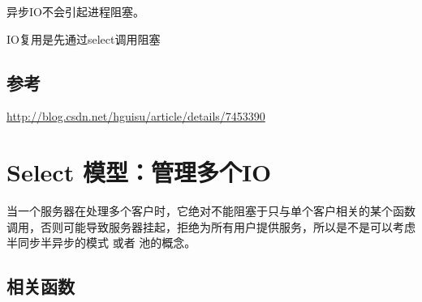 \documentclass[UTF8,a4paper,12pt]{ctexbook}
\begin{document}
			异步IO不会引起进程阻塞。
			
			IO复用是先通过select调用阻塞
		\subsection{参考}\url{http://blog.csdn.net/hguisu/article/details/7453390}
	\section{Select 模型：管理多个IO}
		当一个服务器在处理多个客户时，它绝对不能阻塞于只与单个客户相关的某个函数调用，否则可能导致服务器挂起，拒绝为所有用户提供服务，所以是不是可以考虑半同步半异步的模式 或者 池的概念。
		\subsection{相关函数}
\end{document}
